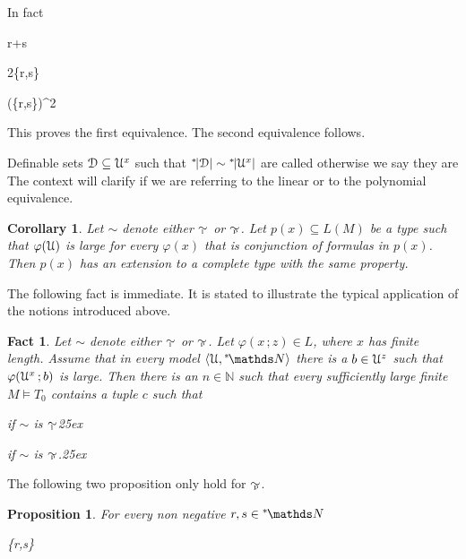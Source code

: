 \documentclass[10pt,oneside, openany]{book}
\renewcommand*{\emph}[1]{%
   \smash{\tikz[baseline]\node[rectangle, fill=green!40, rounded corners, inner xsep=0.5ex, inner ysep=0.2ex, anchor=base, minimum height = 2.7ex]{#1};}}
\def\models{\vDash}
\def\NN{\mathds N}
\def\D{\EuScript D}
\def\U{\EuScript U}
\def\<{\langle}
\def\>{\rangle}
\def\phi{\varphi}
\newcounter{thm}[chapter]
\theoremstyle{mio}
\newtheorem{corollary}[thm]{Corollary}
\newtheorem{proposition}[thm]{Proposition}
\newtheorem{fact}[thm]{Fact}
\theoremstyle{liscio}
\def\QED{\noindent\nolinebreak[4]\hfill\rlap{\ \ $\Box$}\medskip}
\renewenvironment{proof}[1][Proof]%
{\smallskip\begin{trivlist}\item[\hskip\labelsep {\bf #1}]}
{\QED\end{trivlist}}
\def\ns{{}^*\kern-.3ex}
\def\simpoly{\mathrel{\raise-.1ex\rlap{\kern0.6ex\tiny p}\raise.2ex\hbox{$\sim$} }}
\def\simlin{\mathrel{\raise-.3ex\rlap{\kern0.6ex\tiny l}\raise.2ex\hbox{$\sim$} }}
\begin{document}
\begin{proof}
  In fact 

{\le}
{r+s}

\ceq{}
{\le}
{2\max\{r,s\}}

\ceq{}
{\le}
{\big(\max\{r,s\}\big)^2}


This proves the first equivalence.
%
The second equivalence follows.
\end{proof}

Definable sets $\D\subseteq\U^x$ such that  $\ns|\D|\sim\ns|\U^x|$ are called \emph{large,} otherwise we say they are \emph{small.}
%
The context will clarify if we are referring to the linear or to the polynomial equivalence.


\begin{corollary}
  Let $\sim$ denote either $\simlin$ or $\simpoly$.
  Let $p(x)\subseteq L(M)$ be a type such that $\phi(\U)$ is large for every $\phi(x)$ that is conjunction of formulas in $p(x)$.
  Then $p(x)$ has an extension to a complete type with the same property.\QED
\end{corollary}

The following fact is immediate. It is stated to illustrate the typical application of the notions introduced above.

\begin{fact}\label{fact_application}
  Let $\sim$ denote either $\simlin$ or $\simpoly$.
  Let $\phi(x\,;z)\in L$, where $x$ has finite length.
  Assume that in every model $\<\U,\ns\NN\>$ there is a $b\in\U^{z}$ such that $\phi(\U^x\,;b)$ is large.
  Then there is an $n\in\NN$ such that every sufficiently large finite $M\models T_0$ contains a tuple $c$ such that

  \ceq{\hfill\big|M^x\big|}{\le}{n\,\big|\phi(M^x\,;c)\big|}\hfill if $\sim$ is $\simlin$\phantom{.}\kern25ex
  
  \hfill if $\sim$ is $\simpoly$.\kern25ex\rlap{$\square$}

\end{fact}

The following two proposition only hold for $\simpoly$.

\begin{proposition}\label{prop_+=x}
  For every non negative $r,s\in{}^*\kern-.2ex\NN$

  {\simpoly}
  {\max\{r,s\}}
\end{proposition} 
\end{document}
